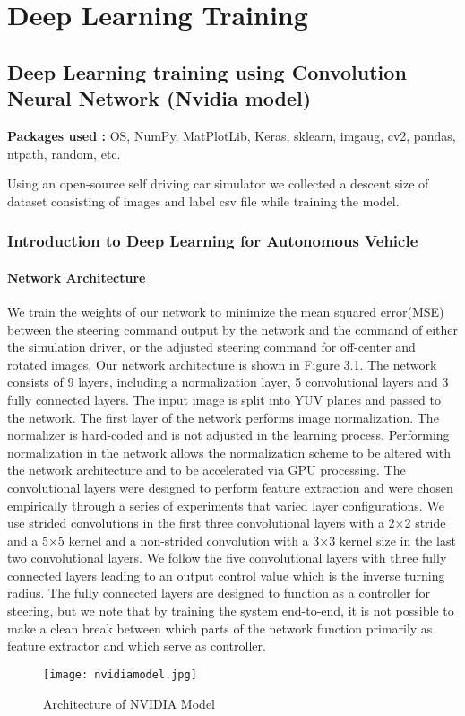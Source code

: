 \chapter{Deep Learning Training }

\section{Deep Learning training using  Convolution Neural Network (Nvidia model)}
{\textbf{Packages used :}}
OS, NumPy, MatPlotLib, Keras, sklearn, imgaug, cv2, pandas, ntpath, random, etc.

Using an open-source self driving car simulator we collected a descent size of dataset consisting of images and label csv file while training the model.

\subsection{Introduction to Deep Learning for Autonomous Vehicle}
\subsubsection{Network Architecture}
We train the weights of our network to minimize the mean squared error(MSE) between the steering command output by the network and the command of either the simulation driver, or the adjusted steering command for off-center and rotated images. Our network architecture is shown in Figure 3.1. The network consists of 9 layers, including a normalization layer, 5 convolutional layers and 3 fully connected layers. The input image is split into YUV planes and passed to the network. The first layer of the network performs image normalization. The normalizer is hard-coded and is not adjusted in the learning process. Performing normalization in the network allows the normalization scheme to be altered with the network architecture and to be accelerated via GPU processing. The convolutional layers were designed to perform feature extraction and were chosen empirically through a series of experiments that varied layer configurations. We use strided convolutions in the first three convolutional layers with a 2×2 stride and a 5×5 kernel and a non-strided convolution with a 3×3 kernel size in the last two convolutional layers. We follow the five convolutional layers with three fully connected layers leading to an output control value which is the inverse turning radius. The fully connected layers are designed to function as a controller for steering, but we note that by training the system end-to-end, it is not possible to make a clean break between which parts of the network function primarily as feature extractor and which serve as controller.
\begin{figure}[H]
	\centering
	\texttt{[image: nvidiamodel.jpg]}
	\caption{Architecture of NVIDIA Model}
\end{figure}
